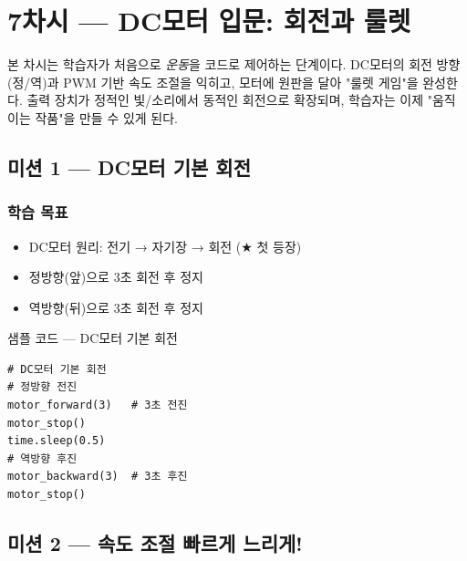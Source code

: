 \section{7차시 --- DC모터 입문: 회전과 룰렛}
\label{sec:ch07}

본 차시는 학습자가 처음으로 \emph{운동}을 코드로 제어하는 단계이다.
DC모터의 회전 방향(정/역)과 PWM 기반 속도 조절을 익히고, 모터에 원판을
달아 "룰렛 게임"을 완성한다. 출력 장치가 정적인 빛/소리에서 동적인
회전으로 확장되며, 학습자는 이제 "움직이는 작품"을 만들 수 있게 된다.

\subsection{미션 1 --- DC모터 기본 회전}
\label{subsec:ch07-m1}

\begin{storybox}
\end{storybox}

\subsubsection*{학습 목표}
\begin{itemize}[leftmargin=1.4em]
  \item DC모터 원리: 전기 → 자기장 → 회전 ($\bigstar$ 첫 등장)
  \item 정방향(앞)으로 3초 회전 후 정지
  \item 역방향(뒤)으로 3초 회전 후 정지
\end{itemize}

\begin{labbox}{샘플 코드 --- DC모터 기본 회전}
\begin{verbatim}
# DC모터 기본 회전
# 정방향 전진
motor_forward(3)   # 3초 전진
motor_stop()
time.sleep(0.5)
# 역방향 후진
motor_backward(3)  # 3초 후진
motor_stop()
\end{verbatim}
\end{labbox}

\subsection{미션 2 --- 속도 조절 빠르게 느리게!}
\label{subsec:ch07-m2}

\begin{storybox}
\end{storybox}

